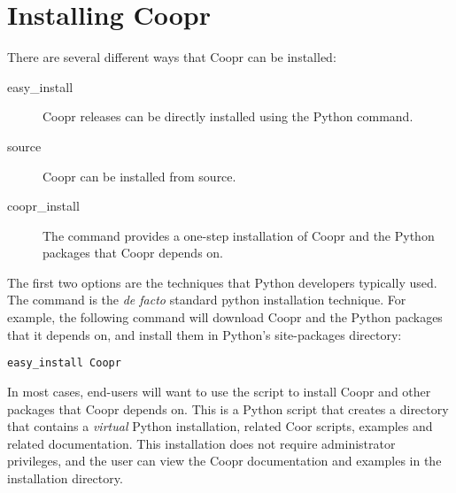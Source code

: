 
\section{Installing Coopr}

There are several different ways that Coopr can be installed:
\begin{description}

\item[easy\_install]  Coopr releases can be directly installed using the Python  command.

\item[source]  Coopr can be installed from source.

\item[coopr\_install]  The  command provides a one-step installation of Coopr and the Python packages that Coopr depends on.

\end{description}
The first two options are the techniques that Python developers typically
used.  The  command is the \textit{de facto} standard
python installation technique.  For example, the following
command will download Coopr and the Python packages that it depends
on, and install them in Python's site-packages directory:
\begin{lstlisting}
easy_install Coopr
\end{lstlisting}

In most cases, end-users will want to use the 
script to install Coopr and other packages that Coopr depends on.
This is a Python script that creates a directory that contains a
\textit{virtual} Python installation, related Coor scripts, examples and
related documentation.  This installation does not require administrator
privileges, and the user can view the Coopr documentation and examples
in the installation directory.

